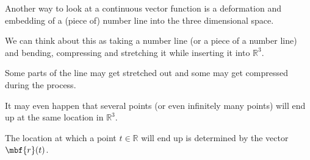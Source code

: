 \documentclass[aspectratio=169]{beamer}
\newcommand{\vect}[1]{\mbf{#1}}
\begin{document}
\begin{frame}
    Another way to look at a continuous vector function is a deformation and
    embedding of a (piece of) number line into the three dimensional
    space.\pause

    We can think about this as taking a number line (or a piece of a number
    line) and bending, compressing and stretching it while inserting it into
    $\mathbb{R}^3$.\pause

    Some parts of the line may get stretched out and some may get compressed
    during the process.\pause

    It may even happen that several points (or even infinitely many points)
    will end up at the same location in $\mathbb{R}^3$.

    The location at which a point $t \in \mathbb{R}$ will end up is determined
    by the vector $\vect{r}(t)$.
\end{frame}
\end{document}
